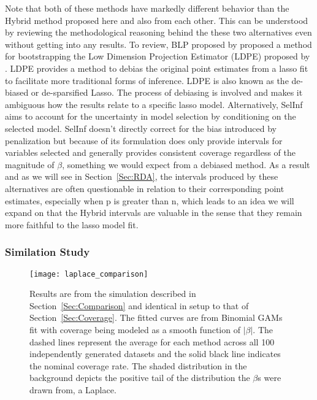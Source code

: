 Note that both of these methods have markedly different behavior than the Hybrid method proposed here and also from each other. This can be understood by reviewing the methodological reasoning behind the these two alternatives even without getting into any results. To review, BLP proposed by \cite{Dezeure2017} proposed a method for bootstrapping the Low Dimension Projection Estimator (LDPE) proposed by \cite{ZhangZhang2014}. LDPE provides a method to debias the original point estimates from a lasso fit to facilitate more traditional forms of inference. LDPE is also known as the de-biased or de-sparsified Lasso. The process of debiasing is involved and makes it ambiguous how the results relate to a specific lasso model. Alternatively, SelInf aims to account for the uncertainty in model selection by conditioning on the selected model. SelInf doesn't directly correct for the bias introduced by penalization but because of its formulation does only provide intervals for variables selected and generally provides consistent coverage regardless of the magnitude of $\beta$, something we would expect from a debiased method. As a result and as we will see in Section~\ref{Sec:RDA}, the intervals produced by these alternatives are often questionable in relation to their corresponding point estimates, especially when p is greater than n, which leads to an idea we will expand on that the Hybrid intervals are valuable in the sense that they remain more faithful to the lasso model fit.

\subsubsection{Similation Study}

\begin{figure}[hbtp]
  \begin{center}
  \texttt{[image: laplace\_comparison]}
  \caption{\label{Fig:laplace_comparison} Results are from the simulation described in Section~\ref{Sec:Comparison} and identical in setup to that of Section~\ref{Sec:Coverage}. The fitted curves are from Binomial GAMs fit with coverage being modeled as a smooth function of $|\beta|$. The dashed lines represent the average for each method across all 100 independently generated datasets and the solid black line indicates the nominal coverage rate. The shaded distribution in the background depicts the positive tail of the distribution the $\beta$s were drawn from, a Laplace.}
  \end{center}
\end{figure}

